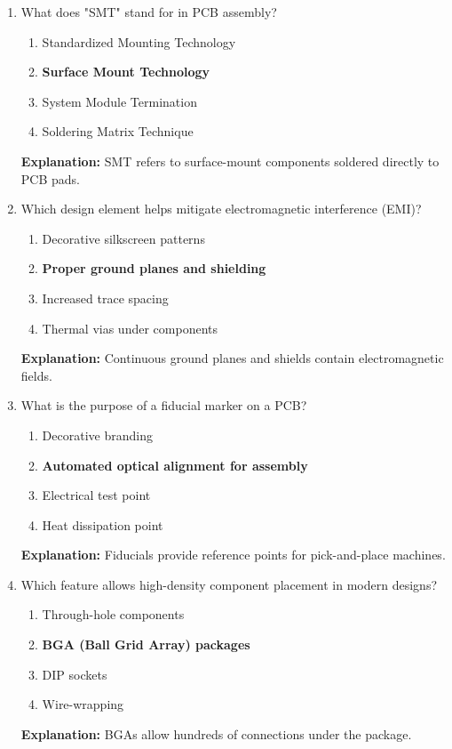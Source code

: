 \documentclass{article}
\begin{document}
\begin{enumerate}[resume]
		\item What does "SMT" stand for in PCB assembly?
		\begin{enumerate}
			\item Standardized Mounting Technology
			\item \textbf{Surface Mount Technology}
			\item System Module Termination
			\item Soldering Matrix Technique
		\end{enumerate}
		\textbf{Explanation:} SMT refers to surface-mount components soldered directly to PCB pads.
		
		\item Which design element helps mitigate electromagnetic interference (EMI)?
		\begin{enumerate}
			\item Decorative silkscreen patterns
			\item \textbf{Proper ground planes and shielding}
			\item Increased trace spacing
			\item Thermal vias under components
		\end{enumerate}
		\textbf{Explanation:} Continuous ground planes and shields contain electromagnetic fields.
		
		\item What is the purpose of a fiducial marker on a PCB?
		\begin{enumerate}
			\item Decorative branding
			\item \textbf{Automated optical alignment for assembly}
			\item Electrical test point
			\item Heat dissipation point
		\end{enumerate}
		\textbf{Explanation:} Fiducials provide reference points for pick-and-place machines.
		
		\item Which feature allows high-density component placement in modern designs?
		\begin{enumerate}
			\item Through-hole components
			\item \textbf{BGA (Ball Grid Array) packages}
			\item DIP sockets
			\item Wire-wrapping
		\end{enumerate}
		\textbf{Explanation:} BGAs allow hundreds of connections under the package.
	\end{enumerate}
	
\end{document}
